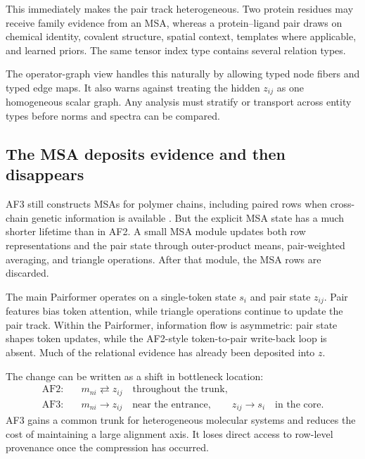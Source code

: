 This immediately makes the pair track heterogeneous.  Two protein residues may receive family
evidence from an MSA, whereas a protein--ligand pair draws on chemical identity, covalent
structure, spatial context, templates where applicable, and learned priors.  The same tensor index
type contains several relation types.

The operator-graph view handles this naturally by allowing typed node fibers and typed edge maps.
It also warns against treating the hidden $z_{ij}$ as one homogeneous scalar graph.  Any analysis
must stratify or transport across entity types before norms and spectra can be compared.

\subsection{The MSA deposits evidence and then disappears}

AF3 still constructs MSAs for polymer chains, including paired rows when cross-chain genetic
information is available \cite{evans2022,abramson2024}.  But the explicit MSA state has a much
shorter lifetime than in AF2.  A small MSA module updates both row representations and the pair
state through outer-product means, pair-weighted averaging, and triangle operations.  After that
module, the MSA rows are discarded.

The main Pairformer operates on a single-token state $s_i$ and pair state $z_{ij}$.  Pair features
bias token attention, while triangle operations continue to update the pair track.  Within the
Pairformer, information flow is asymmetric: pair state shapes token updates, while the AF2-style
token-to-pair write-back loop is absent.  Much of the relational
evidence has already been deposited into $z$.

The change can be written as a shift in bottleneck location:
\begin{equation}
\begin{aligned}
\text{AF2:}&\quad m_{ni}\rightleftarrows z_{ij}\quad\text{throughout the trunk},\\
\text{AF3:}&\quad m_{ni}\longrightarrow z_{ij}\quad\text{near the entrance},
\qquad z_{ij}\longrightarrow s_i\quad\text{in the core}.
\end{aligned}
\label{eq:book-af2-af3-bottleneck}
\end{equation}
AF3 gains a common trunk for heterogeneous molecular systems and reduces the cost of maintaining a
large alignment axis.  It loses direct access to row-level provenance once the compression has
occurred.

